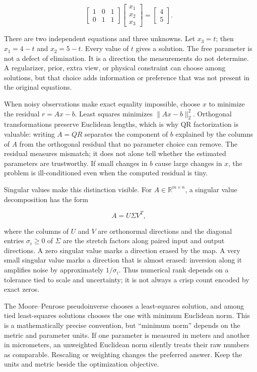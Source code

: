 \[
\begin{bmatrix}1&0&1\\0&1&1\end{bmatrix}
\begin{bmatrix}x_1\\x_2\\x_3\end{bmatrix}
=
\begin{bmatrix}4\\5\end{bmatrix}.
\]

There are two independent equations and three unknowns. Let \(x_3=t\); then \(x_1=4-t\) and \(x_2=5-t\). Every value of \(t\) gives a solution. The free parameter is not a defect of elimination. It is a direction the measurements do not determine. A regularizer, prior, extra view, or physical constraint can choose among solutions, but that choice adds information or preference that was not present in the original equations.

When noisy observations make exact equality impossible, choose \(x\) to minimize the residual \(r=Ax-b\). Least squares minimizes \(\|Ax-b\|_2^2\). Orthogonal transformations preserve Euclidean lengths, which is why QR factorization is valuable: writing \(A=QR\) separates the component of \(b\) explained by the columns of \(A\) from the orthogonal residual that no parameter choice can remove. The residual measures mismatch; it does not alone tell whether the estimated parameters are trustworthy. If small changes in \(b\) cause large changes in \(x\), the problem is ill-conditioned even when the computed residual is tiny.

Singular values make this distinction visible. For \(A\in\mathbb R^{m\times n}\), a singular value decomposition has the form

\[
A=U\Sigma V^T,
\]

where the columns of \(U\) and \(V\) are orthonormal directions and the diagonal entries \(\sigma_i\ge 0\) of \(\Sigma\) are the stretch factors along paired input and output directions. A zero singular value marks a direction erased by the map. A very small singular value marks a direction that is almost erased: inversion along it amplifies noise by approximately \(1/\sigma_i\). Thus numerical rank depends on a tolerance tied to scale and uncertainty; it is not always a crisp count encoded by exact zeros.

The Moore--Penrose pseudoinverse chooses a least-squares solution, and among tied least-squares solutions chooses the one with minimum Euclidean norm. This is a mathematically precise convention, but ``minimum norm'' depends on the metric and parameter units. If one parameter is measured in meters and another in micrometers, an unweighted Euclidean norm silently treats their raw numbers as comparable. Rescaling or weighting changes the preferred answer. Keep the units and metric beside the optimization objective.

